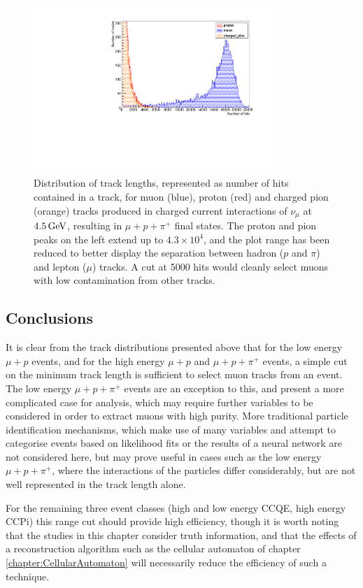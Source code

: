 \begin{figure}
\centering
\includegraphics[angle=-90,width=0.8\textwidth]{chapters/particleid_images/tracks-ccpi-4500MeV}
\caption[Track length distribution for $\mu$, $p$ and $\pi^+$ from $4.5\GeV$ neutrinos (CCPi)]{\label{fig:ccpi-track-lengths-4500MeV}Distribution of track lengths, represented as number of hits contained in a track, for muon (blue), proton (red) and charged pion (orange) tracks produced in charged current interactions of $\nu_\mu$ at $4.5\GeV$, resulting in $\mu + p + \pi^+$ final states. The proton and pion peaks on the left extend up to $4.3\times10^4$, and the plot range has been reduced to better display the separation between hadron ($p$ and $\pi$) and lepton ($\mu$) tracks. A cut at 5000 hits would cleanly select muons with low contamination from other tracks.}
\end{figure}

\subsection{Conclusions}
It is clear from the track distributions presented above that for the low energy $\mu + p$ events, and for the high energy $\mu + p$ and $\mu + p + \pi^+$ events, a simple cut on the minimum track length is sufficient to select muon tracks from an event. The low energy $\mu + p + \pi^+$ events are an exception to this, and present a more complicated case for analysis, which may require further variables to be considered in order to extract muons with high purity. More traditional particle identification mechanisms, which make use of many variables and attempt to categorise events based on likelihood fits or the results of a neural network are not considered here, but may prove useful in cases such as the low energy $\mu + p + \pi^+$, where the interactions of the particles differ considerably, but are not well represented in the track length alone.

For the remaining three event classes (high and low energy CCQE, high energy CCPi) this range cut should provide high efficiency, though it is worth noting that the studies in this chapter consider truth information, and that the effects of a reconstruction algorithm such as the cellular automaton of chapter \ref{chapter:CellularAutomaton} will necessarily reduce the efficiency of such a technique.

